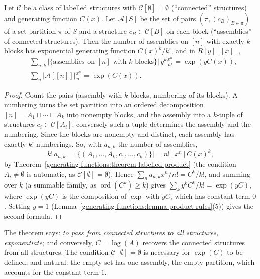 \begin{theorem}\label{generating-functions:theorem-exponential-formula}
Let $\mathcal{C}$ be a class of labelled structures with $\mathcal{C}[\emptyset] = \emptyset$ (``connected'' structures) and generating function $C(x)$. Let $\mathcal{A}[S]$ be the set of pairs
$(\pi, (c_B)_{B \in \pi})$ of a set partition $\pi$ of $S$ and a structure $c_B \in \mathcal{C}[B]$ on each block (``assemblies'' of connected structures). Then the number of assemblies on $[n]$
with exactly $k$ blocks has exponential generating function $C(x)^k/k!$, and in $R[y][[x]]$,
\[
\begin{aligned}
&\sum_{n,k}\bigl|\{\text{assemblies on } [n] \text{ with } k \text{ blocks}\}\bigr|\,y^k\frac{x^n}{n!} = \exp(yC(x)),\\
&\sum_n|\mathcal{A}[[n]]|\frac{x^n}{n!} = \exp(C(x)).
\end{aligned}
\]
\end{theorem}

\begin{proof}
Count the pairs (assembly with $k$ blocks, numbering of its blocks). A numbering turns the set partition into an ordered decomposition $[n] = A_1 \sqcup \cdots \sqcup A_k$ into nonempty blocks, and
the assembly into a $k$-tuple of structures $c_i \in \mathcal{C}[A_i]$; conversely such a tuple determines the assembly and the numbering. Since the blocks are nonempty and distinct, each assembly
has exactly $k!$ numberings. So, with $a_{n,k}$ the number of assemblies,
\[
k!\,a_{n,k} = \bigl|\{(A_1, \ldots, A_k, c_1, \ldots, c_k)\}\bigr| = n![x^n]C(x)^k,
\]
by Theorem~\ref{generating-functions:theorem-labelled-product} (the condition $A_i \neq \emptyset$ is automatic, as $\mathcal{C}[\emptyset] = \emptyset$). Hence
$\sum_na_{n,k}x^n/n! = C^k/k!$, and summing over $k$ (a summable family, as $\operatorname{ord}(C^k) \geq k$) gives $\sum_ky^kC^k/k! = \exp(yC)$, where $\exp(yC)$ is the composition of $\exp$ with
$yC$, which has constant term $0$. Setting $y = 1$ (Lemma~\ref{generating-functions:lemma-product-rules}(5)) gives the second formula.
\end{proof}

The theorem says: \emph{to pass from connected structures to all structures, exponentiate}; and conversely, $C = \log(A)$ recovers the connected structures from all structures. The condition
$\mathcal{C}[\emptyset] = \emptyset$ is necessary for $\exp(C)$ to be defined, and natural: the empty set has one assembly, the empty partition, which accounts for the constant term $1$.

